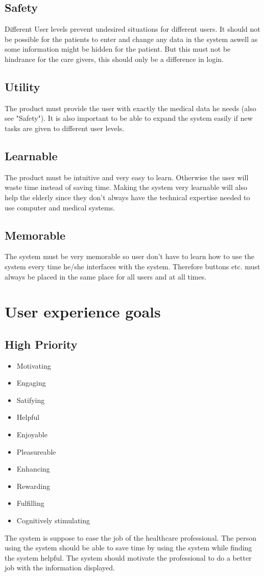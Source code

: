 \subsection{Safety}
Different User levels prevent undesired situations for different users. It should not be possible for the patients to enter and change any data in the system aswell as some information might be hidden for the patient. But this must not be hindrance for the care givers, this should only be a difference in login.

\subsection{Utility}
The product must provide the user with exactly the medical data he needs (also see "Safety"). It is also important to be able to expand the system easily if new tasks are given to different user levels.

\subsection{Learnable}
The product must be intuitive and very easy to learn. Otherwise the user will waste time instead of saving time. Making the system very learnable will also help the elderly since they don't always have the technical expertise needed to use computer and medical systems.

\subsection{Memorable}
The system must be very memorable so user don't have to learn how to use the system every time he/she interfaces with the system. Therefore buttons etc. must always be placed in the same place for all users and at all times.


\section{User experience goals}
\subsection{High Priority}
\begin{itemize}
\item Motivating
\item Engaging
\item Satifying
\item Helpful
\item Enjoyable
\item Pleasureable
\item Enhancing
\item Rewarding
\item Fulfilling
\item Cognitively stimulating
\end{itemize}
The system is suppose to ease the job of the healthcare professional. The person using the system should be able to save time by using the system while finding the system helpful. The system should motivate the professional to do a better job with the information displayed. 

